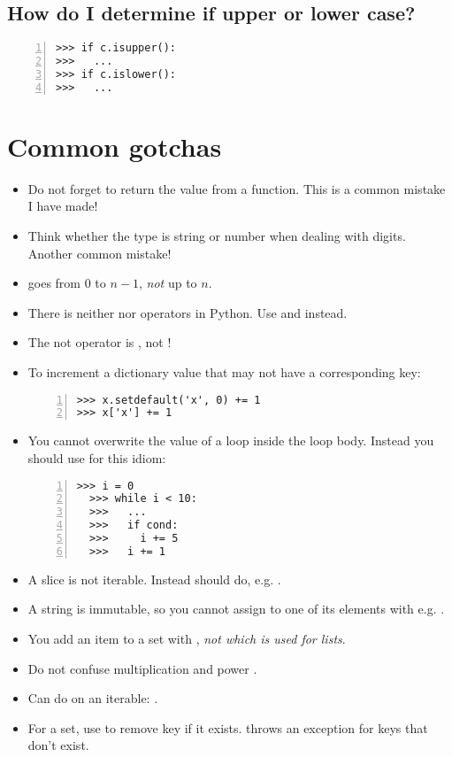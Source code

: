 \documentclass[12pt]{article}
\begin{document}
\subsection{How do I determine if upper or lower case?}
\begin{lstlisting}[numbers=left]
>>> if c.isupper():
>>>   ...
>>> if c.islower():
>>>   ...
\end{lstlisting}

\section{Common gotchas}
\begin{itemize}
\item Do not forget to return the value from a function. This is a common mistake I have made!
\item Think whether the type is string or number when dealing with digits. Another common mistake!
\item {} goes from $0$ to $n-1$, \emph{not} up to $n$.
\item There is neither \python{++} nor \python{--} operators in Python. Use  and  instead.
\item The not operator is , not !
\item To increment a dictionary value that may not have a corresponding key:

\begin{lstlisting}[numbers=left]
>>> x.setdefault('x', 0) += 1
>>> x['x'] += 1
\end{lstlisting}
\item You cannot overwrite the value of a  loop inside the loop body. Instead you should use  for this idiom:

\begin{lstlisting}[numbers=left]
  >>> i = 0
  >>> while i < 10:
  >>>   ...
  >>>   if cond:
  >>>     i += 5
  >>>   i += 1
  \end{lstlisting}
\item A slice is not iterable. Instead should do, e.g. .
\item A string is immutable, so you cannot assign to one of its elements with e.g. .
\item You add an item to a set with , \emph{not  which is used for lists}.
\item Do not confuse multiplication \python{*} and power \python{**}.
\item Can do  on an iterable: .
\item For a set, use  to remove key if it exists.  throws an exception for keys that don't exist.
\end{itemize}

%
%
\end{document}
